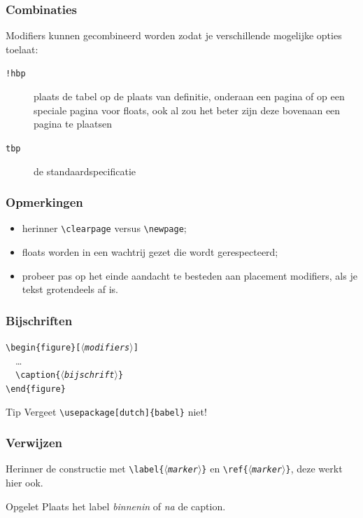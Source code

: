 \begin{frame}
  \frametitle{Combinaties}

  Modifiers kunnen gecombineerd worden zodat je verschillende mogelijke opties toelaat: \\

  \begin{description}
    \item[\texttt{!hbp}] plaats de tabel op de plaats van definitie, onderaan een pagina of op een speciale pagina voor floats, ook al zou het beter zijn deze bovenaan een pagina te plaatsen
    \item[\texttt{tbp}] de standaardspecificatie
  \end{description}
\end{frame}

\begin{frame}
  \frametitle{Opmerkingen}

  \begin{itemize}
    \item herinner \texttt{\textcolor{uagreen}{\textbackslash clearpage}} versus \texttt{\textcolor{uagreen}{\textbackslash newpage}};
    \item floats worden in een wachtrij gezet die wordt gerespecteerd;
    \item probeer pas op het einde aandacht te besteden aan placement modifiers, als je tekst grotendeels af is.
  \end{itemize}
\end{frame}

\begin{frame}
  \frametitle{Bijschriften}

  \texttt{\textcolor{uagreen}{\textbackslash begin}\{figure\}[$\langle$\textsl{modifiers}$\rangle$]} \\
  \ \ \ldots \\
  \ \ \texttt{\textcolor{uagreen}{\textbackslash caption}\{$\langle$\textsl{bijschrift}$\rangle$\}} \\
  \texttt{\textcolor{uagreen}{\textbackslash end}\{figure\}}

  \begin{exampleblock}{Tip}
    Vergeet \texttt{\textcolor{uagreen}{\textbackslash usepackage}[dutch]\{babel\}} niet!
  \end{exampleblock}
\end{frame}

\begin{frame}
  \frametitle{Verwijzen}

  Herinner de constructie met \texttt{\textcolor{uagreen}{\textbackslash label}\{$\langle$\textsl{marker}$\rangle$\}} en \texttt{\textcolor{uagreen}{\textbackslash ref}\{$\langle$\textsl{marker}$\rangle$\}}, deze werkt hier ook.

  \pause

  \begin{alertblock}{Opgelet}
    Plaats het label \emph{binnenin} of \emph{na} de caption.
  \end{alertblock}
\end{frame}

